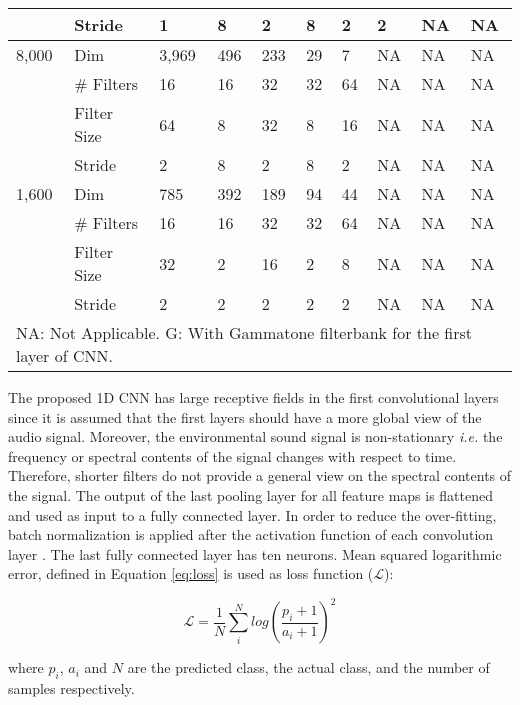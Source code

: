 \documentclass[preprint,final,12pt]{elsarticle}
\begin{document}
\begin{table*}[htpb!]
\begin{tabular}{llllllllll}
                        & Stride      & 1      & 8     & 2     & 8   & 2   & 2   & NA & NA \\ \hline
{8,000}  & Dim         & 3,969  & 496   & 233   & 29  & 7   & NA & NA & NA \\
                        & \# Filters  & 16     & 16    & 32    & 32  & 64  & NA & NA & NA \\
                        & Filter Size & 64     & 8     & 32    & 8   & 16  & NA & NA & NA \\
                        & Stride      & 2      & 8     & 2     & 8   & 2   & NA & NA & NA \\ \hline
{1,600}  & Dim         & 785    & 392   & 189   & 94  & 44  & NA & NA & NA \\
                        & \# Filters  & 16     & 16    & 32    & 32  & 64  & NA & NA & NA \\
                        & Filter Size & 32     & 2     & 16    & 2   & 8   & NA & NA & NA \\
                        & Stride      & 2      & 2     & 2     & 2   & 2   & NA & NA & NA \\ \hline
\multicolumn{10}{l}{\scriptsize{NA: Not Applicable.
G: With Gammatone filterbank for the first layer of CNN.}}
\end{tabular}
\label{tab:arch} \end{table*}

The proposed 1D CNN has large receptive fields in the first convolutional layers since it is assumed that the first layers should have a more global view of the audio signal. Moreover, the environmental sound signal is non-stationary \textit{i.e.} the frequency or spectral contents of the signal changes with respect to time. Therefore, shorter filters do not provide a general view on the spectral contents of the signal. The output of the last pooling layer for all feature maps is flattened and used as input to a fully connected layer. In order to reduce the over-fitting, batch normalization is applied after the activation function of each convolution layer \citep{ioffe2015batch}. The last fully connected layer has ten neurons. Mean squared logarithmic error, defined in Equation \ref{eq:loss} is used as loss function ($\mathcal{L}$):

\begin{equation}
\mathcal{L}=\frac{1}{N}\sum_i^Nlog(\frac{p_{i}+1}{a_{i}+1})^{2}
\label{eq:loss}
\end{equation}

\noindent where \(p_{i}\), \(a_{i}\) and \(N\) are the predicted class, the actual class, and the number of samples respectively.
\end{document}
